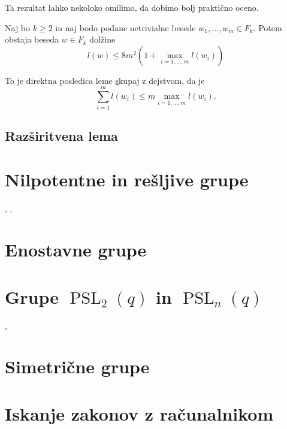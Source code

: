 \documentclass[mat1, tisk]{fmfdelo}
\begin{document}
Ta rezultat lahko nekoloko omilimo, da dobimo bolj praktično oceno.
\begin{posledica}
\label{psl_komutatorska_lema_prakticna}
Naj bo $k \ge 2$ in naj bodo podane netrivialne besede $w_1, \ldots, w_m \in  F_k$. Potem obstaja beseda $w \in  F_k$ dolžine \begin{equation*}
l(w) \le 8m^2 \left(1 + \max_{i = 1, \ldots, m} l(w_i) \right)
\end{equation*}      
\end{posledica}
\begin{dokaz}
    To je direktna posledica leme \href{lem_komutatorska_lema_posplositev} skupaj z dejstvom, da je \begin{equation*}
    \sum_{i = 1}^{m} l(w_{i}) \le m \max_{i = 1, \ldots, m} l(w_i).
    \end{equation*}  
\end{dokaz}


\subsection{Razširitvena lema}

\section{Nilpotentne in rešljive grupe}

\cite{Schneider_2016}, \cite{Bradford_Thom_2022}, \cite{Kozma_Thom_2016}


\section{Enostavne grupe}

\cite{Schneider_2016}

\section{Grupe $\operatorname{PSL}_2(q)$ in $\operatorname{PSL}_n(q)$}

\cite{Bradford_Thom_2022}, \cite{Schneider_2016}

\section{Simetrične grupe}

\cite{Kozma_Thom_2016}

\section{Iskanje zakonov z računalnikom}
\end{document}
